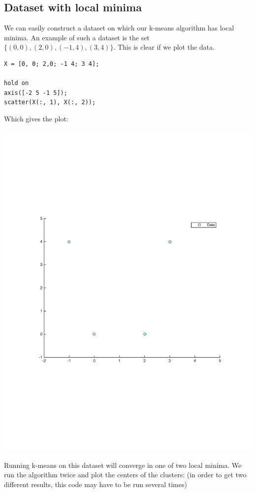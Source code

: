 \documentclass[11pt]{article}
\begin{document}
\subsection{Dataset with local minima} We can easily construct a dataset on which our k-means algorithm has local minima. An example of such a dataset is the set $\{ (0,0), (2,0), (-1, 4), (3, 4) \}$. This is clear if we plot the data.
    \begin{lstlisting}
X = [0, 0; 2,0; -1 4; 3 4];

hold on
axis([-2 5 -1 5]);
scatter(X(:, 1), X(:, 2));\end{lstlisting}
    Which gives the plot:
    \begin{center}
    \includegraphics[width=\linewidth]{localminimapoints}
    \end{center}
    
    Running k-means on this dataset will converge in one of two local minima. We run the algorithm twice and plot the centers of the clusters: (in order to get two different results, this code may have to be run several times)
    
\end{document}
